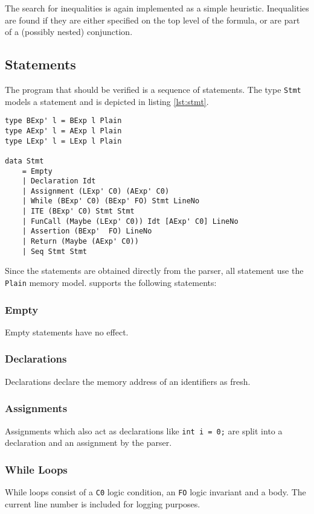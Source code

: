 \documentclass[12pt]{article}
\begin{document}
The search for inequalities is again implemented as a simple heuristic.
Inequalities are found if they are either specified on the top level of the formula, or are part of a (possibly nested) conjunction.

\subsection{Statements}
\label{statements}

The program that should be verified is a sequence of statements.
The type \texttt{Stmt} models a statement and is depicted in listing \ref{lst:stmt}.

\begin{minipage}{\linewidth}
\begin{lstlisting}[style=c0, caption=Stmt, label=lst:stmt]
type BExp' l = BExp l Plain
type AExp' l = AExp l Plain
type LExp' l = LExp l Plain
    
data Stmt 
    = Empty
    | Declaration Idt
    | Assignment (LExp' C0) (AExp' C0)
    | While (BExp' C0) (BExp' FO) Stmt LineNo
    | ITE (BExp' C0) Stmt Stmt
    | FunCall (Maybe (LExp' C0)) Idt [AExp' C0] LineNo
    | Assertion (BExp'  FO) LineNo
    | Return (Maybe (AExp' C0))
    | Seq Stmt Stmt
\end{lstlisting}
\end{minipage}

Since the statements are obtained directly from the parser, all statement use the \texttt{Plain} memory model. 
\verifyc supports the following statements:

\subsubsection*{Empty}
Empty statements have no effect.

\subsubsection*{Declarations}
Declarations declare the memory address of an identifiers as fresh.

\subsubsection*{Assignments}
Assignments which also act as declarations like \texttt{int i = 0;} are split into a declaration and an assignment by the parser.

\subsubsection*{While Loops}
While loops consist of a \texttt{C0} logic condition, an \texttt{FO} logic invariant and a body.
The current line number is included for logging purposes.
\end{document}
